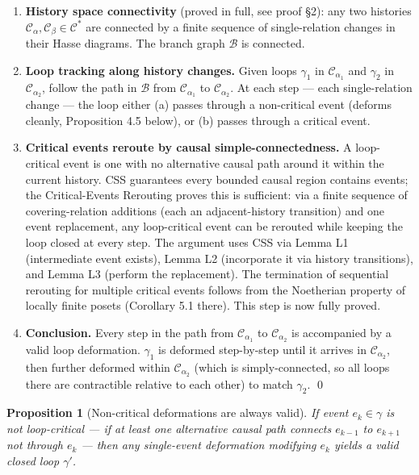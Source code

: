 \documentclass[11pt]{article}
\newtheorem{proposition}[theorem]{Proposition}
\theoremstyle{definition}
\theoremstyle{remark}
\begin{document}
\begin{enumerate}
\def\labelenumi{\arabic{enumi}.}
\item
  \textbf{History space connectivity} (proved in full, see proof
  §2): any two histories
  \(\mathcal{C}_\alpha, \mathcal{C}_\beta \in \mathcal{C}^{\ast}\) are
  connected by a finite sequence of single-relation changes in their
  Hasse diagrams. The branch graph \(\mathcal{B}\) is connected.
\item
  \textbf{Loop tracking along history changes.} Given loops \(\gamma_1\)
  in \(\mathcal{C}_{\alpha_1}\) and \(\gamma_2\) in
  \(\mathcal{C}_{\alpha_2}\), follow the path in \(\mathcal{B}\) from
  \(\mathcal{C}_{\alpha_1}\) to \(\mathcal{C}_{\alpha_2}\). At each step
  --- each single-relation change --- the loop either (a) passes through
  a non-critical event (deforms cleanly, Proposition 4.5 below), or (b)
  passes through a critical event.
\item
  \textbf{Critical events reroute by causal simple-connectedness.} A
  loop-critical event is one with no alternative causal path around it
  within the current history. CSS guarantees every bounded causal region
  contains events; the Critical-Events Rerouting
  proves this is sufficient: via a finite sequence of covering-relation
  additions (each an adjacent-history transition) and one event
  replacement, any loop-critical event can be rerouted while keeping the
  loop closed at every step. The argument uses CSS via Lemma L1
  (intermediate event exists), Lemma L2 (incorporate it via history
  transitions), and Lemma L3 (perform the replacement). The termination
  of sequential rerouting for multiple critical events follows from the
  Noetherian property of locally finite posets (Corollary 5.1 there).
  This step is now fully proved.
\item
  \textbf{Conclusion.} Every step in the path from
  \(\mathcal{C}_{\alpha_1}\) to \(\mathcal{C}_{\alpha_2}\) is
  accompanied by a valid loop deformation. \(\gamma_1\) is deformed
  step-by-step until it arrives in \(\mathcal{C}_{\alpha_2}\), then
  further deformed within \(\mathcal{C}_{\alpha_2}\) (which is
  simply-connected, so all loops there are contractible relative to each
  other) to match \(\gamma_2\). \qed
\end{enumerate}

\begin{proposition}[Non-critical deformations are always valid]
\label{proposition:4-5}
If event $e_k \in \gamma$ is not loop-critical — if at least one alternative causal path connects $e_{k-1}$ to $e_{k+1}$ not through $e_k$ — then any single-event deformation modifying $e_k$ yields a valid closed loop $\gamma'$.
\end{proposition}
\end{document}
